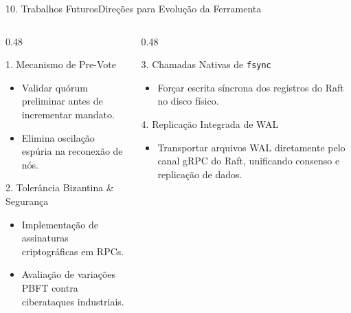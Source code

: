 \documentclass[aspectratio=169,10pt]{beamer}
\begin{document}
\begin{frame}{10. Trabalhos Futuros}{Direções para Evolução da Ferramenta}
  \begin{columns}[t]
    \begin{column}{0.48\textwidth}
      \begin{block}{1. Mecanismo de Pre-Vote}
        \begin{itemize}
          \item Validar quórum preliminar antes de incrementar mandato.
          \item Elimina oscilação espúria na reconexão de nós.
        \end{itemize}
      \end{block}
      \begin{block}{2. Tolerância Bizantina \& Segurança}
        \begin{itemize}
          \item Implementação de assinaturas criptográficas em RPCs.
          \item Avaliação de variações PBFT contra ciberataques industriais.
        \end{itemize}
      \end{block}
    \end{column}
    \begin{column}{0.48\textwidth}
      \begin{block}{3. Chamadas Nativas de \texttt{fsync}}
        \begin{itemize}
          \item Forçar escrita síncrona dos registros do Raft no disco físico.
        \end{itemize}
      \end{block}
      \begin{block}{4. Replicação Integrada de WAL}
        \begin{itemize}
          \item Transportar arquivos WAL diretamente pelo canal gRPC do Raft, unificando consenso e replicação de dados.
        \end{itemize}
      \end{block}
    \end{column}
  \end{columns}
\end{frame}
\end{document}
